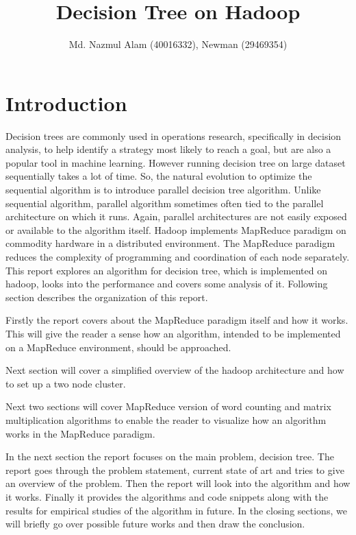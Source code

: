 \documentclass{article}
\title{Decision Tree on Hadoop}
\author{Md. Nazmul Alam (40016332), Newman (29469354)}
\begin{document}
\maketitle
\newpage
\tableofcontents
\listofalgorithms
\lstlistoflistings
{}
\newpage
\section{Introduction}


Decision trees are commonly used in operations research, specifically in decision analysis, to help identify a strategy most likely to reach a goal, but are also a popular tool in machine learning\cite{wikidt}. However running decision tree on large dataset sequentially takes a lot of time. So, the natural evolution to optimize the sequential algorithm is to introduce parallel decision tree algorithm. Unlike sequential algorithm, parallel algorithm sometimes often tied to the parallel architecture on which it runs. Again, parallel architectures are not easily exposed or available to the algorithm itself. Hadoop implements MapReduce paradigm on commodity hardware in a distributed environment. The MapReduce paradigm reduces the complexity of programming and coordination of each node separately.
\BlankLine This report explores an algorithm for decision tree, which is implemented on hadoop, looks into the performance and covers some analysis of it. Following section describes the organization of this report.\BlankLine

Firstly the report covers about the MapReduce paradigm itself and how it works. This will give the reader a sense how an algorithm, intended to be implemented on a MapReduce environment, should be approached.

Next section will cover a simplified overview of the hadoop architecture and how to set up a two node cluster.

Next two sections will cover MapReduce version of word counting and matrix multiplication algorithms to enable the reader to visualize how an algorithm works in the MapReduce paradigm.

In the next section the report focuses on the main problem, decision tree. The report goes through the problem statement, current state of art and tries to give an overview of the problem. Then the report will look into the algorithm and how it works. Finally it provides the algorithms and code snippets along with the results for empirical studies of the algorithm in future.
In the closing sections, we will briefly go over possible future works and then draw the conclusion.
\end{document}
